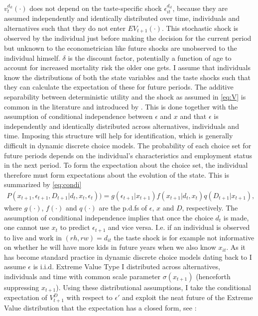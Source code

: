 $v_t^{d_{it}}(\cdot)$ does not depend on the taste-specific shock $\epsilon_{it}^{d_{it}}$, because they are assumed independently and identically distributed over time, individuals and alternatives such that they do not enter $EV_{t+1}(\cdot)$. This stochastic shock is observed by the individual just before making the decision for the current period but unknown to the econometrician like future shocks are unobserved to the individual himself. $\delta$ is the discount factor, potentially a function of age to account for increased mortality risk the older one gets. I assume that individuals know the distributions of both the state variables and the taste shocks such that they can calculate the expectation of these for future periods. The additive separability between deterministic utility and the shock as assumed in \eqref{eq:V} is common in the literature and introduced by \citet{Rust1987}. This is done together with the assumption of conditional independence between $\epsilon$ and $x$ and that $\epsilon$ is independently and identically distributed across alternatives, individuals and time. Imposing this structure will help for identification, which is generally difficult in dynamic discrete choice models. The probability of each choice set for future periods depends on the individual's characteristics and employment status in the next period. To form the expectation about the choice set, the individual therefore must form expectations about the evolution of the state. This is summarized by \eqref{eq:condi}
\begin{align}
P(x_{t+1},\epsilon_{t+1},D_{t+1}|d_t,x_t,\epsilon_t))=g(\epsilon_{t+1}|x_{t+1})f(x_{t+1}|d_t,x_t)q(D_{t+1}|x_{t+1}),
\label{eq:condi}
\end{align}
where $g(\cdot)$, $f(\cdot)$ and $q(\cdot)$ are the p.d.fs of $\epsilon$, $x$ and $D$, respectively. The assumption of conditional independence implies that once the choice $d_t$ is made, one cannot use $x_t$ to predict $\epsilon_{t+1}$ and vice versa. I.e. if an individual is observed to live and work in $(rh,rw)=d_{it}$ the taste shock is for example not informative on whether he will have more kids in future years when we also know $x_{it}$. As it has become standard practice in dynamic discrete choice models dating back to \citet{McFadden1974} I assume $\epsilon$ is i.i.d. Extreme Value Type I distributed across alternatives, individuals and time with common scale parameter $\sigma(x_{t+1})$ (henceforth suppressing $x_{t+1}$). Using these distributional assumptions, I take the conditional expectation of $V^D_{t+1}$ with respect to $\epsilon'$ and exploit the neat future of the Extreme Value distribution that the expectation has a closed form, see \citet{Rust1987}:
